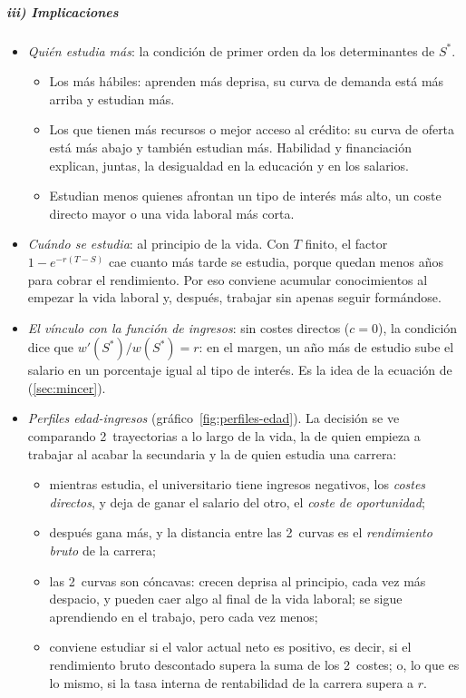 \documentclass[11pt]{article}
\begin{document}
\subparagraph{iii) Implicaciones}

\begin{itemize}
\item \emph{Quién estudia más}: la condición de primer orden da los determinantes de $S^*$.
  \begin{itemize}
  \item Los más hábiles: aprenden más deprisa, su curva de demanda está más arriba y estudian más.
  \item Los que tienen más recursos o mejor acceso al crédito: su curva de oferta está más abajo y también estudian más. Habilidad y financiación explican, juntas, la desigualdad en la educación y en los salarios\nocite{Becker1967Human}.
  \item Estudian menos quienes afrontan un tipo de interés más alto, un coste directo mayor o una vida laboral más corta.
  \end{itemize}
\item \emph{Cuándo se estudia}: al principio de la vida. Con $T$ finito, el factor $1-e^{-r(T-S)}$ cae cuanto más tarde se estudia, porque quedan menos años para cobrar el rendimiento. Por eso conviene acumular conocimientos al empezar la vida laboral y, después, trabajar sin apenas seguir formándose.
\item \emph{El vínculo con la función de ingresos}: sin costes directos ($c=0$), la condición dice que $w'(S^*)/w(S^*)=r$: en el margen, un año más de estudio sube el salario en un porcentaje igual al tipo de interés. Es la idea de la ecuación de  (\ref{sec:mincer}).
\item \emph{Perfiles edad-ingresos} (gráfico~\ref{fig:perfiles-edad}). La decisión se ve comparando 2~trayectorias a lo largo de la vida, la de quien empieza a trabajar al acabar la secundaria y la de quien estudia una carrera\nocite{McConnellBrue1997Economia}:
  \begin{itemize}
  \item mientras estudia, el universitario tiene ingresos negativos, los \emph{costes directos}, y deja de ganar el salario del otro, el \emph{coste de oportunidad};
  \item después gana más, y la distancia entre las 2~curvas es el \emph{rendimiento bruto} de la carrera;
  \item las 2~curvas son cóncavas: crecen deprisa al principio, cada vez más despacio, y pueden caer algo al final de la vida laboral; se sigue aprendiendo en el trabajo, pero cada vez menos;
  \item conviene estudiar si el valor actual neto es positivo, es decir, si el rendimiento bruto descontado supera la suma de los 2~costes; o, lo que es lo mismo, si la tasa interna de rentabilidad de la carrera supera a $r$.
  \end{itemize}
\end{itemize}
\end{document}
